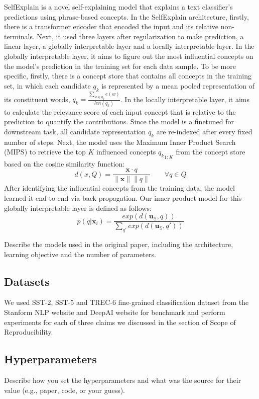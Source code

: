 \documentclass{article}
\begin{document}
SelfExplain is a novel self-explaining model that explains a text classifier's predictions using phrase-based concepts. In the SelfExplain architecture, firstly, there is a transformer encoder that encoded the input and its relative non-terminals. Next, it used three layers after regularization to make prediction, a linear layer, a globally interpretable layer and a locally interpretable layer. In the globally interpretable layer, it aims to figure out the most influential concepts on the model's prediction in the training set for each data sample. To be more specific, firstly, there is a concept store that contains all concepts in the training set, in which each candidate $q_k$ is represented by a mean pooled representation of its constituent words, $q_k = \frac{\sum_{w \in q_k}{e(w)}}{len(q_k)}  $. In the locally interpretable layer, it aims to calculate the relevance score of each input concept that is relative to the prediction to quantify the contributions. Since the model is a finetuned for downstream task, all candidate representation $q_k$ are re-indexed after every fixed number of steps. 
Next, the model uses the Maximum Inner Product Search (MIPS) to retrieve the top $K$ influenced concepts ${q_k}_{1:K}$ from the concept store based on the cosine similarity function: 
$$d(x, Q) = \frac{\mathbf{x} \cdot q}{ \|\mathbf{x}\| \|q\|}  \qquad  \forall q \in Q$$
After identifying the influential concepts from the training data, the model learned it end-to-end via back propagation. Our inner product model for this globally interpretable layer is defined as follows:
$$  p(q|\mathbf{x}_i) = \frac{exp(d(\mathbf{u}_\mathbb{S}, q))}{\sum_{q'} exp(d(\mathbf{u}_\mathbb{S}, q'))}$$

Describe the models used in the original paper, including the architecture, learning objective and the number of parameters.

\subsection{Datasets}

We used SST-2, SST-5 and TREC-6 fine-grained classification dataset from the Stanform NLP website and DeepAI website for 
benchmark and perform experiments for each of three claims we discussed in the section of 
Scope of Reproducibility.

\subsection{Hyperparameters}
Describe how you set the hyperparameters and what was the source for their value (e.g., paper, code, or your guess). 
\end{document}
